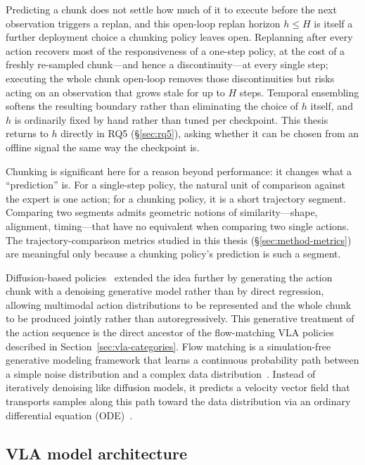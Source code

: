 \documentclass[english,12pt,a4paper,pdftex,elec,utf8]{aaltothesis}
\begin{document}
Predicting a chunk does not settle how much of it to execute before the next observation triggers a replan, and this open-loop replan horizon $h\le H$ is itself a further deployment choice a chunking policy leaves open. Replanning after every action recovers most of the responsiveness of a one-step policy, at the cost of a freshly re-sampled chunk---and hence a discontinuity---at every single step; executing the whole chunk open-loop removes those discontinuities but risks acting on an observation that grows stale for up to $H$ steps. Temporal ensembling softens the resulting boundary rather than eliminating the choice of $h$ itself, and $h$ is ordinarily fixed by hand rather than tuned per checkpoint. This thesis returns to $h$ directly in RQ5 (\S\ref{sec:rq5}), asking whether it can be chosen from an offline signal the same way the checkpoint is.

Chunking is significant here for a reason beyond performance: it changes what a ``prediction'' is. For a single-step policy, the natural unit of comparison against the expert is one action; for a chunking policy, it is a short trajectory segment. Comparing two segments admits geometric notions of similarity---shape, alignment, timing---that have no equivalent when comparing two single actions. The trajectory-comparison metrics studied in this thesis (\S\ref{sec:method-metrics}) are meaningful only because a chunking policy's prediction is such a segment.

Diffusion-based policies~\cite{chi2023diffusion} extended the idea further by generating the action chunk with a denoising generative model rather than by direct regression, allowing multimodal action distributions to be represented and the whole chunk to be produced jointly rather than autoregressively. This generative treatment of the action sequence is the direct ancestor of the flow-matching VLA policies described in Section~\ref{sec:vla-categories}. Flow matching is a simulation-free generative modeling framework that learns a continuous probability path between a simple noise distribution and a complex data distribution~\cite{lipman2023flow}. Instead of iteratively denoising like diffusion models, it predicts a velocity vector field that transports samples along this path toward the data distribution via an ordinary differential equation (ODE)~\cite{patel2024exploringdiffusionflowmatching}.

\subsection{VLA model architecture}
\label{subsec:vla-architecture}
\end{document}
